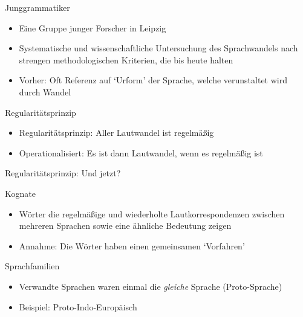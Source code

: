 \begin{frame}{Junggrammatiker}
	\begin{itemize}
		\item Eine Gruppe junger Forscher in Leipzig
		\item Systematische und wissenschaftliche Untersuchung des Sprachwandels nach strengen methodologischen Kriterien, die bis heute halten
		\item Vorher: Oft Referenz auf `Urform' der Sprache, welche verunstaltet wird durch Wandel
	\end{itemize}
		\pause
		\begin{block}{Regularitätsprinzip}
			\begin{itemize}
			\item Regularitätsprinzip: Aller Lautwandel ist regelmäßig
			\item Operationalisiert: Es ist dann Lautwandel, wenn es regelmäßig ist \parencite{Hoenigswald1978}
		\end{itemize}
	\end{block} 
\end{frame}

\begin{frame}{Regularitätsprinzip: Und jetzt?}
\begin{block}{Kognate}
	\begin{itemize}
		\item Wörter die regelmäßige und wiederholte Lautkorrespondenzen zwischen mehreren Sprachen sowie eine ähnliche Bedeutung zeigen
		\pause
		\item Annahme: Die Wörter haben einen gemeinsamen `Vorfahren'
	\end{itemize}
\end{block}

\begin{block}{Sprachfamilien}
	\begin{itemize}
		\item Verwandte Sprachen waren einmal die \textit{gleiche} Sprache (Proto-Sprache)
		\item Beispiel: Proto-Indo-Europäisch
	\end{itemize}
\end{block}
\end{frame}


